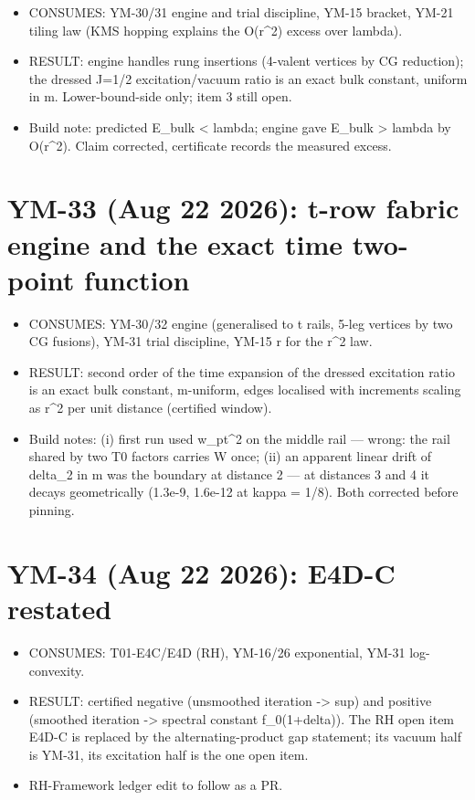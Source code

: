 \begin{itemize}
\tightlist
\item
  CONSUMES: YM-30/31 engine and trial discipline, YM-15 bracket,
  YM-21 tiling law (KMS hopping explains the O(r\^{}2) excess over lambda).
\item
  RESULT: engine handles rung insertions (4-valent vertices by CG
  reduction); the dressed J=1/2 excitation/vacuum ratio is an exact bulk
  constant, uniform in m. Lower-bound-side only; item 3 still open.
\item
  Build note: predicted E\_bulk \textless{} lambda; engine gave E\_bulk \textgreater{} lambda by
  O(r\^{}2). Claim corrected, certificate records the measured excess.
\end{itemize}

\hypertarget{ym-33-aug-22-2026-t-row-fabric-engine-and-the-exact-time-two-point-function}{%
\section{YM-33 (Aug 22 2026): t-row fabric engine and the exact time two-point function}\label{ym-33-aug-22-2026-t-row-fabric-engine-and-the-exact-time-two-point-function}}

\begin{itemize}
\tightlist
\item
  CONSUMES: YM-30/32 engine (generalised to t rails, 5-leg vertices by
  two CG fusions), YM-31 trial discipline, YM-15 r for the r\^{}2 law.
\item
  RESULT: second order of the time expansion of the dressed excitation
  ratio is an exact bulk constant, m-uniform, edges localised with
  increments scaling as r\^{}2 per unit distance (certified window).
\item
  Build notes: (i) first run used w\_pt\^{}2 on the middle rail --- wrong: the
  rail shared by two T0 factors carries W once; (ii) an apparent linear
  drift of delta\_2 in m was the boundary at distance 2 --- at distances
  3 and 4 it decays geometrically (1.3e-9, 1.6e-12 at kappa = 1/8).
  Both corrected before pinning.
\end{itemize}

\hypertarget{ym-34-aug-22-2026-e4d-c-restated}{%
\section{YM-34 (Aug 22 2026): E4D-C restated}\label{ym-34-aug-22-2026-e4d-c-restated}}

\begin{itemize}
\tightlist
\item
  CONSUMES: T01-E4C/E4D (RH), YM-16/26 exponential, YM-31 log-convexity.
\item
  RESULT: certified negative (unsmoothed iteration -\textgreater{} sup) and positive
  (smoothed iteration -\textgreater{} spectral constant f\_0(1+delta)). The RH open
  item E4D-C is replaced by the alternating-product gap statement; its
  vacuum half is YM-31, its excitation half is the one open item.
\item
  RH-Framework ledger edit to follow as a PR.
\end{itemize}

